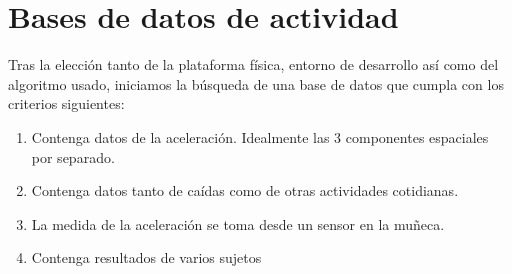 \section{Bases de datos de actividad}\label{sec:req:bases:datos}

Tras la elección tanto de la plataforma física, entorno de desarrollo así como del algoritmo usado, iniciamos la búsqueda de una base de datos que cumpla con los criterios siguientes:

\begin{enumerate}
  \item Contenga datos de la aceleración. Idealmente las 3 componentes espaciales por separado.
  \item Contenga datos tanto de caídas como de otras actividades cotidianas.
  \item La medida de la aceleración se toma desde un sensor en la muñeca.
  \item Contenga resultados de varios sujetos
\end{enumerate}

